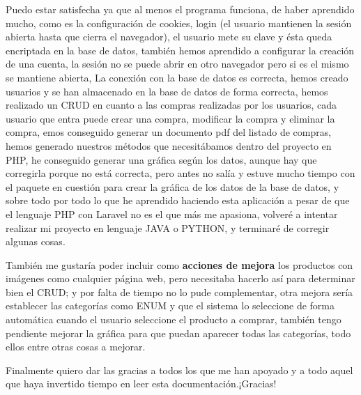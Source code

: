 \documentclass{article}
\begin{document}
Puedo estar satisfecha ya que al menos el programa funciona, de haber aprendido mucho, como es la configuración de cookies, login (el usuario mantienen la sesión abierta hasta que cierra el navegador), el usuario mete su clave y ésta queda encriptada en la base de datos, también hemos aprendido a configurar la creación de una cuenta, la sesión no se puede abrir en otro navegador pero si es el mismo se mantiene abierta, La conexión con la base de datos es correcta, hemos creado usuarios y se han almacenado en la base de datos de forma correcta, hemos realizado un CRUD en cuanto a las compras realizadas por los usuarios, cada usuario que entra puede crear una compra, modificar la compra y eliminar la compra, emos conseguido generar un documento pdf del listado de compras, hemos generado nuestros métodos que necesitábamos dentro del proyecto en PHP, he conseguido generar una gráfica según los datos, aunque hay que corregirla porque no está correcta, pero antes no salía y estuve mucho tiempo con el paquete en cuestión para crear la gráfica de los datos de la base de datos, y sobre todo por todo lo que he aprendido haciendo esta aplicación a pesar de que el lenguaje PHP con Laravel no es el que más me apasiona, volveré a intentar realizar mi proyecto en lenguaje JAVA o PYTHON, y terminaré de corregir algunas cosas.

También me gustaría poder incluir como \textbf{acciones de mejora} los productos con imágenes como cualquier página web, pero necesitaba hacerlo así para determinar bien el CRUD; y por falta de tiempo no lo pude complementar, otra mejora sería establecer las categorías como ENUM y que el sistema lo seleccione de forma automática cuando el usuario seleccione el producto a comprar, también tengo pendiente mejorar la gráfica para que puedan aparecer todas las categorías, todo ellos entre otras cosas a mejorar.

Finalmente quiero dar las gracias a todos los que me han apoyado y a todo aquel que haya invertido tiempo en leer esta documentación.¡Gracias!




\end{document}
